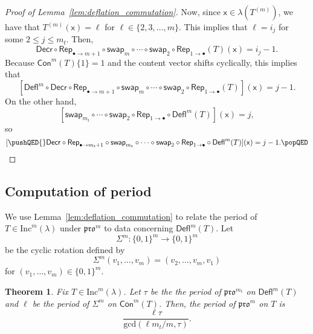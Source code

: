 \documentclass[12pt]{amsart}
\newcommand{\x}{\ensuremath{\mathsf{x}}}
\newtheorem{theorem}{Theorem}[section]
\theoremstyle{definition}
\theoremstyle{remark}
\numberwithin{equation}{section}
\newcommand{\inc}{\ensuremath{\mathrm{Inc}}}
\newcommand{\pro}{\mathfrak{pro}}
\newcommand{\swap}{\ensuremath{\mathsf{swap}}}
\newcommand{\decr}{\ensuremath{\mathsf{Decr}}}
\newcommand{\rep}{\ensuremath{\mathsf{Rep}}}
\newcommand{\deflate}{\ensuremath{\mathsf{Defl}}}
\newcommand{\content}{\ensuremath{\mathsf{Con}}}
\begin{document}
\begin{proof}[Proof of Lemma~\ref{lem:deflation_commutation}]
Now, since $\x \in \lambda(T^{(m)})$, we have that $T^{(m)}(\x) = \ell$ for $\ell \in \{2,3,\dots,m\}$. This implies that $\ell = i_j$ for some $2 \leq j \leq m_t$. Then, 
\[
\decr \circ \rep_{\bullet \to m+1} \circ \swap_m \circ \cdots \circ \swap_2 \circ \rep_{1 \rightarrow \bullet} (T)(\x) = i_j-1.
\]
Because $\content^m(T) \lbrace 1 \rbrace = 1$ and the content vector shifts cyclically, this implies that 
 \[
 [\deflate^m \circ \decr \circ \rep_{\bullet \rightarrow m+1} \circ \swap_m \circ \cdots \circ \swap_2 \circ \rep_{1 \rightarrow \bullet} (T)](\x) = j-1.
 \]
  On the other hand, 
  \[
  [\swap_{m_t} \circ \cdots \circ \swap_2 \circ \rep_{1 \rightarrow \bullet} \circ \deflate^m(T)](\x) = j,
  \]
   so 
   \[
   [ \pushQED{\qed} \decr \circ \rep_{\bullet \rightarrow m_t + 1} \circ \swap_{m_t} \circ \cdots \circ \swap_2 \circ \rep_{1 \rightarrow \bullet} \circ  \deflate^m(T)](\x) = j-1. \qedhere \popQED \] \let\qed\relax
\end{proof}

\subsection{Computation of period}\label{sec:period} We use Lemma~\ref{lem:deflation_commutation} to relate the period of $T \in \inc^m(\lambda)$ under $\pro^m$ to data concerning $\deflate^m(T)$. Let 
\[\Sigma^m : \lbrace 0,1\rbrace^m \rightarrow \lbrace 0,1\rbrace^m\]
 be the cyclic rotation defined by 
 \[
 \Sigma^m(v_1, \dots, v_m) = (v_2, \dots, v_m, v_1)
 \]
  for $(v_1, \dots, v_m) \in \lbrace 0,1 \rbrace^m$. 
  
\begin{theorem}\label{thm:periodthm}
Fix $T \in \inc^m(\lambda)$. Let $\tau$ be the the period of $\pro^{m_t}$ on $\deflate^m(T)$ and $\ell$ be the period of $\Sigma^m$ on $\content^m(T)$. Then, the period of $\pro^m$ on $T$ is \[\frac{\ell  \tau}{\mathrm{gcd}(\ell m_t / m,\tau)}. \]
\end{theorem} 
    
\end{document}
